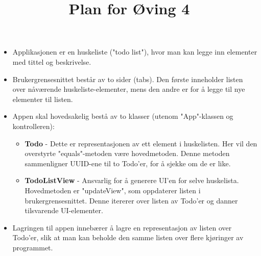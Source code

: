 \documentclass[12pt,a4paper]{article}
\title{Plan for Øving 4}
\author{}
\date{}
\begin{document}
\maketitle

\begin{itemize}
    \item Applikasjonen er en huskeliste ("todo list"), hvor man kan legge inn elementer med tittel og beskrivelse.
    \item Brukergrensesnittet består av to sider (tabs). Den første inneholder listen over nåværende
          huskeliste-elementer, mens den andre er for å legge til nye elementer til listen.
    \item Appen skal hovedsakelig bestå av to klasser (utenom "App"-klassen og kontrolleren):
          \begin{itemize}
              \item \textbf{Todo} - Dette er representasjonen av ett element i huskelisten. Her vil den overstyrte
                    "equals"-metoden være hovedmetoden. Denne metoden sammenligner UUID-ene til to Todo'er, for å
                    sjekke om de er like.
              \item \textbf{TodoListView} - Ansvarlig for å generere UI'en for selve huskelista. Hovedmetoden er
                    "updateView", som oppdaterer listen i brukergrensesnittet. Denne itererer over listen av Todo'er
                    og danner tilsvarende UI-elementer.
          \end{itemize}
    \item Lagringen til appen innebærer å lagre en representasjon av listen over Todo'er, slik at man kan beholde den
          samme listen over flere kjøringer av programmet.
\end{itemize}
\end{document}
